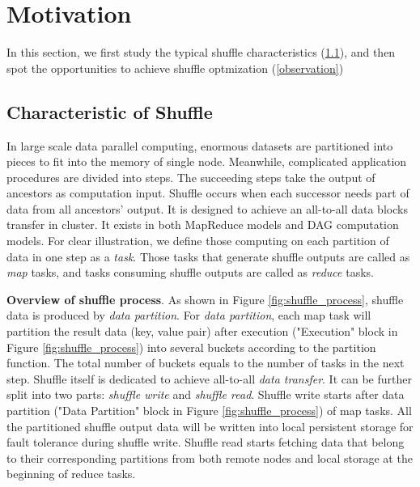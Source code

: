 \section{Motivation}

In this section, we first study the typical shuffle characteristics (\ref{shuffle pattern}), and then spot the opportunities to achieve shuffle optmization (\ref{observation})
\subsection{Characteristic of Shuffle} \label{shuffle pattern}

In large scale data parallel computing, enormous datasets are partitioned into pieces to fit into the memory of single node.
Meanwhile, complicated application procedures are divided into steps. The succeeding steps take the output of ancestors as computation input. Shuffle occurs when each successor needs 
part of data from all ancestors' output. It is designed to achieve an all-to-all data blocks transfer in cluster. It exists in both MapReduce models and DAG computation models.
For clear illustration, we define those computing on each partition of data in one step as a \textit{task}. 
Those tasks that generate shuffle outputs are called as \textit{map} tasks, and tasks consuming shuffle outputs are called as \textit{reduce} tasks.

\textbf{Overview of shuffle process}. As shown in Figure \ref{fig:shuffle_process}, shuffle data is produced by \textit{data partition}. For \textit{data partition}, each map task will partition the result data (key, value pair) after execution ("Execution" block in Figure \ref{fig:shuffle_process}) into several buckets according to the partition function.
The total number of buckets equals to the number of tasks in the next step. 
Shuffle itself is dedicated to achieve all-to-all \textit{data transfer}.
It can be further split into two parts: \textit{shuffle write} and \textit{shuffle read}. Shuffle write starts after data partition ("Data Partition" block in Figure \ref{fig:shuffle_process}) of map tasks. 
All the partitioned shuffle output data will be written into local persistent storage for fault tolerance \cite{mapreduce, spark} during shuffle write.
Shuffle read starts fetching data that belong to their corresponding partitions from both remote nodes and local storage at the beginning of reduce tasks.

